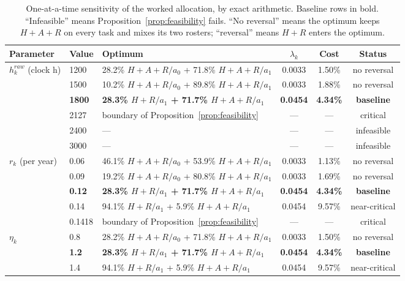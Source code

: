 \documentclass[utf8]{FrontiersinHarvard}
\begin{document}
	\begin{table}[!htbp]
		\caption{One-at-a-time sensitivity of the worked allocation, by exact arithmetic. Baseline rows in bold. ``Infeasible'' means Proposition~\ref{prop:feasibility} fails. ``No reversal'' means the optimum keeps $H{+}A{+}R$ on every task and mixes its two rosters; ``reversal'' means $H{+}R$ enters the optimum.}
		\label{tab:sensitivity}
		\footnotesize
		\begin{tabularx}{\textwidth}{@{}llXccc@{}}
			\toprule
			\textbf{Parameter} & \textbf{Value} & \textbf{Optimum} & \textbf{$\lambda_k$} & \textbf{Cost} & \textbf{Status}\\
			\midrule
			\multirow{6}{*}{$h^{raw}_k$ (clock h)}
			& 1200 & 28.2\% $H{+}A{+}R/a_0$ + 71.8\% $H{+}A{+}R/a_1$ & 0.0033 & 1.50\% & no reversal\\
			& 1500 & 10.2\% $H{+}A{+}R/a_0$ + 89.8\% $H{+}A{+}R/a_1$ & 0.0033 & 1.88\% & no reversal\\
			& \textbf{1800} & \textbf{28.3\% $H{+}R/a_1$ + 71.7\% $H{+}A{+}R/a_1$} & \textbf{0.0454} & \textbf{4.34\%} & \textbf{baseline}\\
			& 2127 & boundary of Proposition~\ref{prop:feasibility} & --- & --- & critical\\
			& 2400 & --- & --- & --- & infeasible\\
			& 3000 & --- & --- & --- & infeasible\\
			\midrule
			\multirow{5}{*}{$r_k$ (per year)}
			& 0.06 & 46.1\% $H{+}A{+}R/a_0$ + 53.9\% $H{+}A{+}R/a_1$ & 0.0033 & 1.13\% & no reversal\\
			& 0.09 & 19.2\% $H{+}A{+}R/a_0$ + 80.8\% $H{+}A{+}R/a_1$ & 0.0033 & 1.69\% & no reversal\\
			& \textbf{0.12} & \textbf{28.3\% $H{+}R/a_1$ + 71.7\% $H{+}A{+}R/a_1$} & \textbf{0.0454} & \textbf{4.34\%} & \textbf{baseline}\\
			& 0.14 & 94.1\% $H{+}R/a_1$ + 5.9\% $H{+}A{+}R/a_1$ & 0.0454 & 9.57\% & near-critical\\
			& 0.1418 & boundary of Proposition~\ref{prop:feasibility} & --- & --- & critical\\
			\midrule
			\multirow{4}{*}{$\eta_k$}
			& 0.8 & 28.2\% $H{+}A{+}R/a_0$ + 71.8\% $H{+}A{+}R/a_1$ & 0.0033 & 1.50\% & no reversal\\
			& \textbf{1.2} & \textbf{28.3\% $H{+}R/a_1$ + 71.7\% $H{+}A{+}R/a_1$} & \textbf{0.0454} & \textbf{4.34\%} & \textbf{baseline}\\
			& 1.4 & 94.1\% $H{+}R/a_1$ + 5.9\% $H{+}A{+}R/a_1$ & 0.0454 & 9.57\% & near-critical\\

\end{tabularx}
\end{table}
\end{document}
